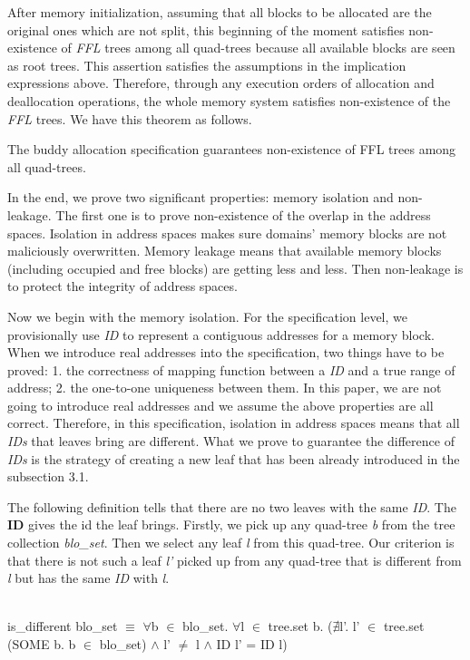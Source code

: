 After memory initialization, assuming that all blocks to be allocated are the original ones which are not split, this beginning of the moment satisfies non-existence of \emph{FFL} trees among all quad-trees because all available blocks are seen as root trees. This assertion satisfies the assumptions in the implication expressions above. Therefore, through any execution orders of allocation and deallocation operations, the whole memory system satisfies non-existence of the \emph{FFL} trees. We have this theorem as follows.

\begin{theorem}
	The buddy allocation specification guarantees non-existence of FFL trees among all quad-trees.
\end{theorem}

In the end, we prove two significant properties: memory isolation and non-leakage. The first one is to prove non-existence of the overlap in the address spaces. Isolation in address spaces makes sure domains' memory blocks are not maliciously overwritten. Memory leakage means that available memory blocks (including occupied and free blocks) are getting less and less. Then non-leakage is to protect the integrity of address spaces.

Now we begin with the memory isolation. For the specification level, we provisionally use \emph{ID} to represent a contiguous addresses for a memory block. When we introduce real addresses into the specification, two things have to be proved: 1. the correctness of mapping function between a \emph{ID} and a true range of address; 2. the one-to-one uniqueness between them. In this paper, we are not going to introduce real addresses and we assume the above properties are all correct. Therefore, in this specification, isolation in address spaces means that all \emph{IDs} that leaves bring are different. What we prove to guarantee the difference of \emph{IDs} is the strategy of creating a new leaf that has been already introduced in the subsection 3.1.

The following definition tells that there are no two leaves with the same \emph{ID}. The \textbf{ID} gives the id the leaf brings. Firstly, we pick up any quad-tree \emph{b} from the tree collection \emph{blo\_set}. Then we select any leaf \emph{l} from this quad-tree. Our criterion is that there is not such a leaf \emph{l'} picked up from any quad-tree that is different from \emph{l} but has the same \emph{ID} with \emph{l}.

\begin{definition}  \\
	is\_different blo\_set $\equiv$ $\forall$b $\in$ blo\_set. $\forall$l $\in$ tree.set b. ($\nexists$l'. l' $\in$ tree.set (SOME b. b $\in$ blo\_set) $\wedge$ l' $\ne$ l $\wedge$ ID l' = ID l)
\end{definition}


